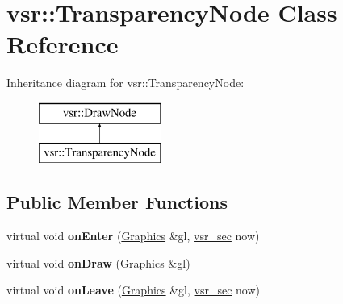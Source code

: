 \hypertarget{classvsr_1_1_transparency_node}{\section{vsr\-:\-:Transparency\-Node Class Reference}
\label{classvsr_1_1_transparency_node}
}
Inheritance diagram for vsr\-:\-:Transparency\-Node\-:\begin{figure}[H]
\begin{center}
\leavevmode
\includegraphics[height=2.000000cm]{classvsr_1_1_transparency_node}
\end{center}
\end{figure}
\subsection*{Public Member Functions}
\begin{DoxyCompactItemize}
\item 
\hypertarget{classvsr_1_1_transparency_node_ab04d131d6f195d63f29e640bc01ca5ae}{virtual void {\bfseries on\-Enter} (\hyperlink{classvsr_1_1_graphics}{Graphics} \&gl, \hyperlink{classvsr_1_1vsr__sec}{vsr\-\_\-sec} now)}\label{classvsr_1_1_transparency_node_ab04d131d6f195d63f29e640bc01ca5ae}

\item 
\hypertarget{classvsr_1_1_transparency_node_a0eb3b83cf961f67c5b89b518b2b73dd2}{virtual void {\bfseries on\-Draw} (\hyperlink{classvsr_1_1_graphics}{Graphics} \&gl)}\label{classvsr_1_1_transparency_node_a0eb3b83cf961f67c5b89b518b2b73dd2}

\item 
\hypertarget{classvsr_1_1_transparency_node_a4c8f41bbc6312bb7a487fa8cae0c7b01}{virtual void {\bfseries on\-Leave} (\hyperlink{classvsr_1_1_graphics}{Graphics} \&gl, \hyperlink{classvsr_1_1vsr__sec}{vsr\-\_\-sec} now)}\label{classvsr_1_1_transparency_node_a4c8f41bbc6312bb7a487fa8cae0c7b01}

\end{DoxyCompactItemize}

